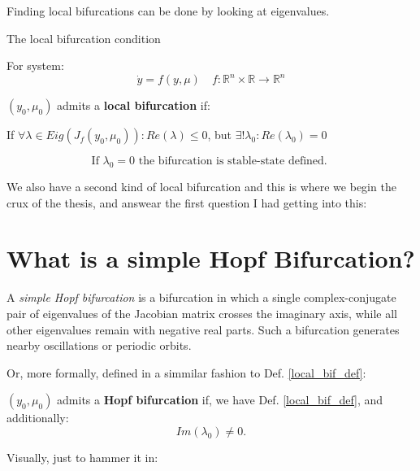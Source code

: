 Finding local bifurcations can be done by looking at eigenvalues.
\newpage
{\large The local bifurcation condition

}For system:
\begin{equation}
  \dot{y} = f(y, \mu) \quad f : \mathbb{R}^n \times \mathbb{R} \rightarrow \mathbb{R}^n
\end{equation}

\begin{definition}\label{local_bif_def}
  $(y_0,\mu_0)$ admits a \textbf{local bifurcation} if:
\end{definition}

If $\forall \lambda \in Eig(J_{f}(y_0,\mu_0)) : Re(\lambda) \leq 0$, but $\exists! \lambda_0 : Re(\lambda_0) = 0$

\begin{equation}\label{stable_state_bif}
  \text{If } \lambda_0 = 0 \text{ the bifurcation is stable-state defined. }
\end{equation}

We also have a second kind of local bifurcation and this is where we begin the crux of the thesis, and answear the first question I had getting into this:

\section{What is a simple Hopf Bifurcation?}

A \textit{simple Hopf bifurcation} is a bifurcation in which a single complex-conjugate pair of eigenvalues of the Jacobian matrix crosses the imaginary axis, while all other eigenvalues remain with negative real parts. Such a bifurcation generates nearby oscillations or periodic orbits.

Or, more formally, defined in a simmilar fashion to Def. \ref{local_bif_def}:

\begin{definition}
  $(y_0, \mu_0)$ admits a \textbf{Hopf bifurcation} if, we have Def. \ref{local_bif_def}, and additionally:
  \begin{equation}\label{hopf_bif_def}
    Im(\lambda_0) \neq 0.
  \end{equation}
\end{definition}
\newpage
Visually, just to hammer it in:


